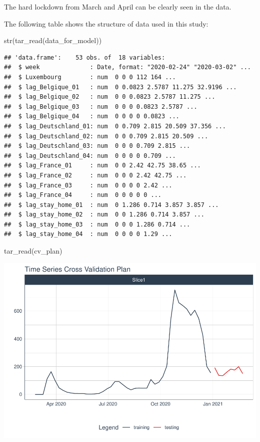 \documentclass{article}
\newenvironment{Shaded}{\begin{snugshade}}{\end{snugshade}}
\newcommand{\FunctionTok}[1]{\textcolor[rgb]{0.00,0.00,0.00}{#1}}
\newcommand{\NormalTok}[1]{#1}
\begin{document}
The hard lockdown from March and April can be clearly seen in the data.

The following table shows the structure of data used in this study:

\begin{Shaded}
\begin{Highlighting}[]
\FunctionTok{str}\NormalTok{(}\FunctionTok{tar\_read}\NormalTok{(data\_for\_model))}
\end{Highlighting}
\end{Shaded}

\begin{verbatim}
## 'data.frame':    53 obs. of  18 variables:
##  $ week              : Date, format: "2020-02-24" "2020-03-02" ...
##  $ Luxembourg        : num  0 0 0 112 164 ...
##  $ lag_Belgique_01   : num  0 0.0823 2.5787 11.275 32.9196 ...
##  $ lag_Belgique_02   : num  0 0 0.0823 2.5787 11.275 ...
##  $ lag_Belgique_03   : num  0 0 0 0.0823 2.5787 ...
##  $ lag_Belgique_04   : num  0 0 0 0 0.0823 ...
##  $ lag_Deutschland_01: num  0 0.709 2.815 20.509 37.356 ...
##  $ lag_Deutschland_02: num  0 0 0.709 2.815 20.509 ...
##  $ lag_Deutschland_03: num  0 0 0 0.709 2.815 ...
##  $ lag_Deutschland_04: num  0 0 0 0 0.709 ...
##  $ lag_France_01     : num  0 0 2.42 42.75 38.65 ...
##  $ lag_France_02     : num  0 0 0 2.42 42.75 ...
##  $ lag_France_03     : num  0 0 0 0 2.42 ...
##  $ lag_France_04     : num  0 0 0 0 0 ...
##  $ lag_stay_home_01  : num  0 1.286 0.714 3.857 3.857 ...
##  $ lag_stay_home_02  : num  0 0 1.286 0.714 3.857 ...
##  $ lag_stay_home_03  : num  0 0 0 1.286 0.714 ...
##  $ lag_stay_home_04  : num  0 0 0 0 1.29 ...
\end{verbatim}

\begin{Shaded}
\begin{Highlighting}[]
\FunctionTok{tar\_read}\NormalTok{(cv\_plan)}
\end{Highlighting}
\end{Shaded}

\includegraphics{paper_files/figure-latex/unnamed-chunk-6-1.pdf}
\end{document}
